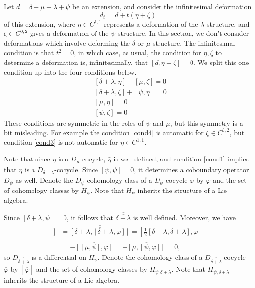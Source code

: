 \documentclass[12pt]{amsart}
\theoremstyle{definition}
\begin{document}
Let $d=\delta+\mu+\lambda+\psi$ be an extension, and consider the
infinitesimal deformation
$$
d_t=d+t(\eta+\zeta)
$$
of this extension, where $\eta\in C^{1,1}$ represents a deformation
of the $\lambda$ structure, and $\zeta\in C^{0,2}$ gives a
deformation of the $\psi$ structure. In this section, we don't
consider deformations which involve deforming the $\delta$ or $\mu$
structure. The infinitesimal condition  is that $t^2=0$, in which
case, as usual, the condition for $\eta,\zeta$ to determine a
deformation is, infinitesimally, that $[d,\eta+\zeta]=0$. We split
this one condition up into the four conditions below.
\begin{align}
&[\delta+\lambda,\eta]+[\mu,\zeta]=0\label{cond1}\\
&[\delta+\lambda,\zeta]+[\psi,\eta]=0\label{cond2}\\
&[\mu,\eta]=0\label{cond3}\\
&[\psi,\zeta]=0\label{cond4}
\end{align}
These conditions are symmetric in the roles of $\psi$ and $\mu$, but
this symmetry is a bit misleading. For example the condition \eqref{cond4} is automatic for
$\zeta\in C^{0,2}$, but condition \eqref{cond3} is not automatic for $\eta\in C^{1,1}$.

Note that since $\eta$ is a $D_\mu$-cocycle, $\bar\eta$ is well defined, and condition \eqref{cond1} implies
that $\bar\eta$ is a $D_{\bar\delta+\bar\lambda}$-cocycle.  Since $[\psi,\psi]=0$, it determines a coboundary
operator $D_\psi$ as well.  Denote the $D_\psi$-cohomology class of a $D_\psi$-cocycle ${\varphi}$ by
${\overline{\overline{{\varphi}}}}$ and the set of cohomology classes by
${H_\psi}$. Note that ${H_\psi}$ inherits the structure of a Lie algebra.

Since $[\delta+\lambda,\psi]=0$, it follows that ${\overline{\overline{\delta+\lambda}}}$ is well defined.
Moreover, we have
\begin{align*}
[{\overline{\overline{{\delta+\lambda}}}},[{\overline{\overline{{\delta+\lambda}}}},{\overline{\overline{{\varphi}}}}]]&={\overline{\overline{{[\delta+\lambda,[\delta+\lambda,{\varphi}]]}}}}=
{\overline{\overline{{[\tfrac12[\delta+\lambda,\delta+\lambda],{\varphi}]}}}}
\\&=-{\overline{\overline{{[[\mu,\psi],{\varphi}]}}}}=-{\overline{\overline{{[\mu,[\psi,{\varphi}]]}}}}=0,
\end{align*}
so $D_{\overline{\overline{\delta+\lambda}}}$ is a differential on ${H_\psi}$.
Denote the cohomology class of a $D_{\overline{\overline{\delta+\lambda}}}$-cocycle ${\overline{\overline{{\varphi}}}}$ by
${\left[\overline{\overline{{\varphi}}}\right]}$ and the set of cohomology classes by ${H_{\psi,\delta+\lambda}}$. Note that ${H_{\psi,\delta+\lambda}}$ inherits the structure
of a Lie algebra.
\end{document}
